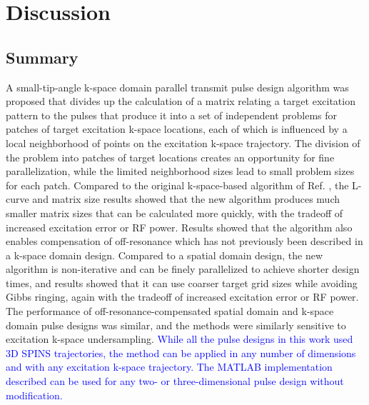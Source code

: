 \section*{Discussion}
\subsection*{Summary}
A small-tip-angle k-space domain parallel transmit pulse design algorithm was proposed
that divides up the calculation of a matrix relating a target excitation pattern to the pulses that produce it 
into a set of independent problems for patches of target excitation k-space locations,
each of which is influenced by a local neighborhood of points on the excitation k-space trajectory.
The division of the problem into patches of target locations creates an opportunity for fine parallelization,
while the limited neighborhood sizes lead to small problem sizes for each patch. 
Compared to the original k-space-based algorithm of Ref. \cite{Katscher:2003:Magn-Reson-Med:12509830},
the L-curve and matrix size results showed that 
the new algorithm produces much smaller matrix sizes that can be calculated more quickly,
with the tradeoff of increased excitation error or RF power. 
Results showed that the algorithm also enables compensation of off-resonance 
which has not previously been described in a k-space domain design. 
Compared to a spatial domain design,
the new algorithm is non-iterative and can be finely parallelized to achieve shorter design times, 
and results showed that it can use coarser target grid sizes while avoiding Gibbs ringing, 
again with the tradeoff of increased excitation error or RF power.
The performance of off-resonance-compensated spatial domain and k-space domain pulse designs was similar,
and the methods were similarly sensitive to excitation k-space undersampling. 
\textcolor{blue}{While all the pulse designs in this work used 3D SPINS trajectories,
the method can be applied in any number of dimensions and with any excitation k-space trajectory.
The MATLAB implementation described can be used for any two- or three-dimensional pulse design without modification.}

